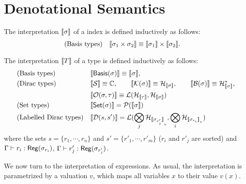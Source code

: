\section{Denotational Semantics}
\label{sec: full denotational sem}

\begin{definition}
The interpretation ${\llbracket \sigma \rrbracket}$ of a index is defined inductively as follows:
    \begin{align*}
        & \textrm{(Basis types)} &&
        {\llbracket \sigma_1 \times \sigma_2 \rrbracket} \equiv {\llbracket \sigma_1 \rrbracket} \times {\llbracket \sigma_2 \rrbracket}.
     \end{align*}
\end{definition}

\begin{definition}
The interpretation ${\llbracket T \rrbracket}$ of a type is defined inductively as follows:
\begin{align*}
    & \text{(Basis types)} && \begin{aligned}
      & {\llbracket \mathsf{Basis}(\sigma) \rrbracket} \equiv {\llbracket \sigma \rrbracket},
 \end{aligned} \\
    & \text{(Dirac types)} &&
 {\llbracket \mathcal{S} \rrbracket} \equiv \mathbb{C},
 \qquad
 {\llbracket \mathcal{K}(\sigma) \rrbracket} \equiv \mathcal{H}_{{\llbracket \sigma \rrbracket}}, 
 \qquad
 {\llbracket \mathcal{B}(\sigma) \rrbracket} \equiv \mathcal{H}^*_{{\llbracket \sigma \rrbracket}},
      \\ & &&
 {\llbracket \mathcal{O}(\sigma, \tau) \rrbracket} \equiv \mathcal{L}(\mathcal{H}_{\llbracket \tau \rrbracket}, \mathcal{H}_{\llbracket \sigma \rrbracket})
    \\
    & \text{(Set types)} &&
    {\llbracket \mathsf{Set}(\sigma) \rrbracket} = \mathcal{P}({\llbracket \sigma \rrbracket}) \\
    & \text{(Labelled Dirac types)} &&
    {\llbracket {\mathcal{D}}(s,s') \rrbracket} = \mathcal{L}(\bigotimes_{j}{\mathcal{H}}_{{\llbracket \sigma_{r'_j} \rrbracket}_v}, \bigotimes_{i}{\mathcal{H}}_{{\llbracket \sigma_{r_i} \rrbracket}_v})
\end{align*}
where the sets $s = \{r_1,\cdots,r_n\}$ and $s' = \{r'_1,\cdots,r'_m\}$ ($r_i$ and $r'_j$ are sorted) and $\Gamma \vdash r_i : \mathsf{Reg}(\sigma_{r_i})$, $\Gamma \vdash r'_j : \mathsf{Reg}(\sigma_{r'_j})$.
\end{definition}

We now turn to the interpretation of expressions. As usual, the interpretation is parametrized by a valuation \(v\), which maps all variables $x$ to their value $v(x)$. 

